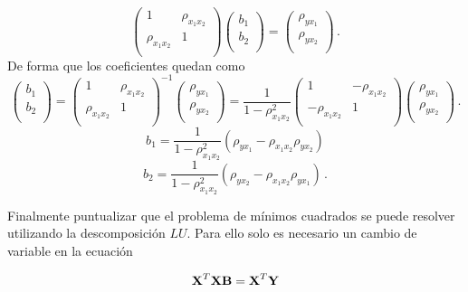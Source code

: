 \documentclass[
]{agujournal2019}
\begin{document}
\[\left(\begin{array}{cc}
  1 & \rho_{x_{1} x_{2}} \\
  \rho_{x_{1} x_{2}} & 1 \\
        \end{array}\right)
  \left(\begin{array}{c}
  b_1 \\
  b_2 \\
        \end{array}\right)=
     \left(\begin{array}{c}
  \rho_{y x_{1}} \\
  \rho_{y x_{2}} \\
        \end{array}\right)\,.\] De forma que los coeficientes quedan
como \[\left(\begin{array}{c}
  b_1 \\
  b_2 \\
        \end{array}\right)=\left(\begin{array}{cc}
  1 & \rho_{x_{1} x_{2}} \\
  \rho_{x_{1} x_{2}} & 1 \\
        \end{array}\right)^{-1}
     \left(\begin{array}{c}
  \rho_{y x_{1}} \\
  \rho_{y x_{2}} \\
        \end{array}\right)=\frac{1}{1-\rho^2_{x_{1} x_{2}}}
    \left(\begin{array}{cc}
  1 & -\rho_{x_{1} x_{2}} \\
  -\rho_{x_{1} x_{2}} & 1 \\
        \end{array}\right)\left(\begin{array}{c}
  \rho_{y x_{1}} \\
  \rho_{y x_{2}} \\
        \end{array}\right)\,.\]
\[b_1=\frac{1}{1-\rho^2_{x_{1} x_{2}}}({\rho_{y x_{1}} - \rho_{x_{1} x_{2}} \rho_{y x_{2}}})\]
\[b_2=\frac{1}{1-\rho^2_{x_{1} x_{2}}}({\rho_{y x_{2}} - \rho_{x_{1} x_{2}} \rho_{y x_{1}}})\,.\]

\noindent Finalmente puntualizar que el problema de mínimos cuadrados se
puede resolver utilizando la descomposición \(LU\). Para ello solo es
necesario un cambio de variable en la ecuación

\[{\textbf X}^T{\textbf X}{\textbf B}={\textbf X}^T{\textbf Y}\]
\end{document}
